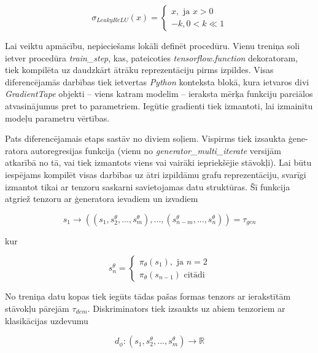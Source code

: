 \documentclass[12pt, a4paper]{article}
\numberwithin{equation}{section} %
\begin{document}
\begin{equation}
    \sigma_{LeakyReLU}(x) = 
    \begin{cases}
        x, \text{ ja } x > 0 \\
        -k, 0 < k \ll 1
    \end{cases}
\end{equation}

Lai veiktu apmācību, nepieciešams lokāli definēt procedūru. Vienu treniņa soli ietver procedūra \textit{train\_step}, kas, pateicoties \textit{tensorflow.function} dekoratoram, tiek kompilēta uz daudzkārt ātrāku reprezentāciju pirms izpildes. Visas diferencējamās darbības tiek ietvertas \textit{Python} konteksta blokā, kura ietvaros divi \textit{GradientTape} objekti -- viens katram modelim -- ieraksta mērķa funkciju parciālos atvasinājumus pret to parametriem. Iegūtie gradienti tiek izmantoti, lai izmainītu modeļu parametru vērtības.

Pats diferencējamais etaps sastāv no diviem soļiem. Vispirms tiek izsaukta ģene-ratora autoregresijas funkcija (vienu no \textit{generator\_multi\_iterate} versijām atkarībā no tā, vai tiek izmantots viens vai vairāki iepriekšējie stāvokļi). Lai būtu iespējams kompilēt visas darbības uz ātri izpildāmu grafu reprezentāciju, svarīgi izmantot tikai ar tenzoru saskarni savietojamas datu struktūras. Šī funkcija atgriež tenzoru ar ģeneratora ievadiem un izvadiem

\begin{equation}
    s_1 \rightarrow \left ( (s_1, s^{\theta}_2 , ..., s^{\theta}_m), ...,  (s^{\theta}_{n-m}, ..., s^{\theta}_{n}) \right ) = \tau_{gen}
\end{equation}

kur

\begin{equation}
    s^{\theta}_n = 
    \begin{cases}
        \pi_{\theta}(s_1), \text{ ja } n = 2 \\
        \pi_{\theta}(s_{n-1}) \text{ citādi}
    \end{cases}
\end{equation}


No treniņa datu kopas tiek iegūts tādas pašas formas tenzors ar ierakstītām stāvokļu pārejām $\tau_{dem}$. Diskriminators tiek izsaukts uz abiem tenzoriem ar klasikācijas uzdevumu

\begin{equation}
    d_{\phi}: (s_1, s^{\theta}_2 , ..., s^{\theta}_m) \rightarrow \mathbb{R}
\end{equation}
\end{document}
